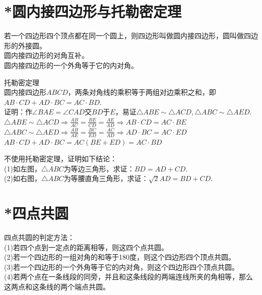 \section{*圆内接四边形与托勒密定理}
\begin{theorem}
    若一个四边形四个顶点都在同一个圆上，则四边形叫做圆内接四边形，圆叫做四边形的外接圆。\\
    圆内接四边形的对角互补。\\
    圆内接四边形的一个外角等于它的内对角。
\end{theorem}
\begin{theorem}
    托勒密定理 \\
    圆内接四边形$ABCD$，两条对角线的乘积等于两组对边乘积之和，即$AB·CD+AD·BC=AC·BD$. \\
    证明：作$\angle BAE=\angle CAD$交$BD$于$E$，易证$\triangle ABE\sim \triangle ACD,\triangle ABC \sim \triangle AED$. \\
    $\triangle ABE \sim \triangle ACD \Rightarrow \frac{AB}{AC}=\frac{BE}{CD}=\frac{AE}{AD} \Rightarrow AB·CD=AC·BE$ \\
    $\triangle ABC \sim \triangle AED \Rightarrow \frac{AB}{AE}=\frac{BC}{ED}=\frac{AC}{AD} \Rightarrow AD·BC=AC·ED$ \\
    $AB·CD+AD·BC=AC(BE+ED)=AC·BD$ \\
\end{theorem}
\begin{problem}
不使用托勒密定理，证明如下结论：\\
(1)如左图，$\triangle ABC$为等边三角形，求证：$BD=AD+CD$. \\
(2)如右图，$\triangle ABC$为等腰直角三角形，求证：$\sqrt{2}AD=BD+CD$.
\end{problem}
\clearpage
\section{*四点共圆}
\begin{theorem}
    四点共圆的判定方法：\\
    (1)若四个点到一定点的距离相等，则这四个点共圆。\\
    (2)若一个四边形的一组对角的和等于180度，则这个四边形四个顶点共圆。\\
    (3)若一个四边形的一个外角等于它的内对角，则这个四边形四个顶点共圆。\\
    (4)若两个点在一条线段的同旁，并且和这条线段的两端连线所夹的角相等，那么这两点和这条线的两个端点共圆。
\end{theorem}
\clearpage
